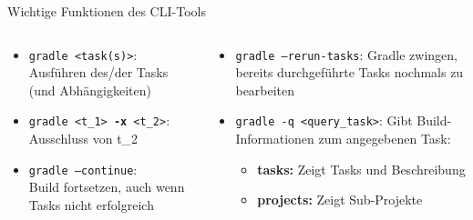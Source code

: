 \documentclass[newPxFont,numfooter,sectionpages,notes]{beamer}
\begin{document}
\begin{frame}{Wichtige Funktionen des CLI-Tools}
	\begin{columns}
		\begin{column}{0.48\textwidth}
			\begin{itemize}
				\item \texttt{gradle <task(s)>}: Ausführen des/der Tasks (und Abhängigkeiten)
				\item \texttt{gradle <t\_1> \textbf{-x} <t\_2>}: Ausschluss von t\_2 
				\item \texttt{gradle --continue}: \\ Build fortsetzen, auch wenn Tasks nicht erfolgreich
			\end{itemize}
		\end{column}
		\begin{column}{0.48\textwidth}
			\begin{itemize}
				\item \texttt{gradle --rerun-tasks}: Gradle zwingen, bereits durchgeführte Tasks nochmals zu bearbeiten
				\item \texttt{gradle -q <query\_task>}: Gibt Build-Informationen zum angegebenen Task:
				\begin{itemize}
					\item \textbf{tasks:} Zeigt Tasks und Beschreibung
					\item \textbf{projects:} Zeigt Sub-Projekte
				\end{itemize}
			\end{itemize}
		\end{column}
	\end{columns}

	
\end{frame}
\end{document}
